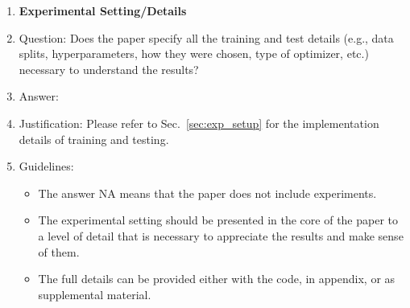 \documentclass{article}
\begin{document}
\begin{enumerate}
\item {\bf Experimental Setting/Details}
    \item[] Question: Does the paper specify all the training and test details (e.g., data splits, hyperparameters, how they were chosen, type of optimizer, etc.) necessary to understand the results?
    \item[] Answer: \answerYes{} %
    \item[] Justification: Please refer to Sec.~\ref{sec:exp_setup} for the implementation details of training and testing.
    \item[] Guidelines:
    \begin{itemize}
        \item The answer NA means that the paper does not include experiments.
        \item The experimental setting should be presented in the core of the paper to a level of detail that is necessary to appreciate the results and make sense of them.
        \item The full details can be provided either with the code, in appendix, or as supplemental material.
    \end{itemize}


\end{enumerate}
\end{document}
